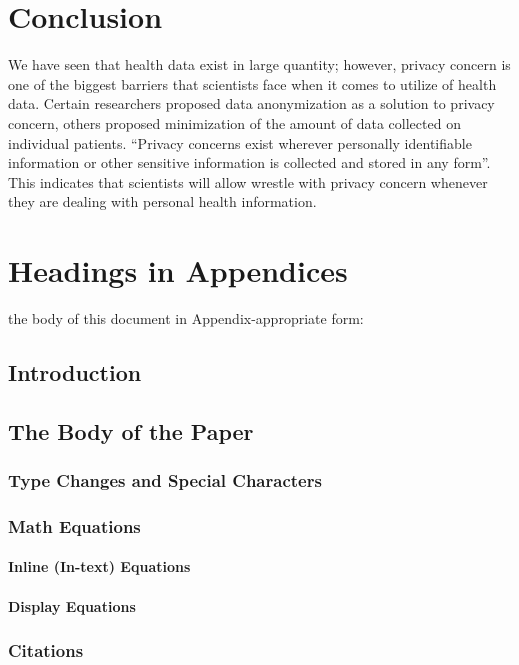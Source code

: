 \documentclass[sigconf]{acmart}
\begin{document}
\section{Conclusion}

We have seen that health data exist in large quantity; however, privacy concern is one of the biggest barriers that scientists face when it comes to utilize of health data. Certain researchers proposed data anonymization as a solution to privacy concern, others proposed minimization of the amount of data collected on individual patients. “Privacy concerns exist wherever personally identifiable information or other sensitive information is collected and stored in any form”.\cite{khan2014big} This indicates that scientists will allow wrestle with privacy concern whenever they are dealing with personal health information.  



\appendix

\section{Headings in Appendices}

the body of this document in Appendix-appropriate form:

\subsection{Introduction}
\subsection{The Body of the Paper}
\subsubsection{Type Changes and  Special Characters}
\subsubsection{Math Equations}
\paragraph{Inline (In-text) Equations}
\paragraph{Display Equations}
\subsubsection{Citations}
\end{document}
